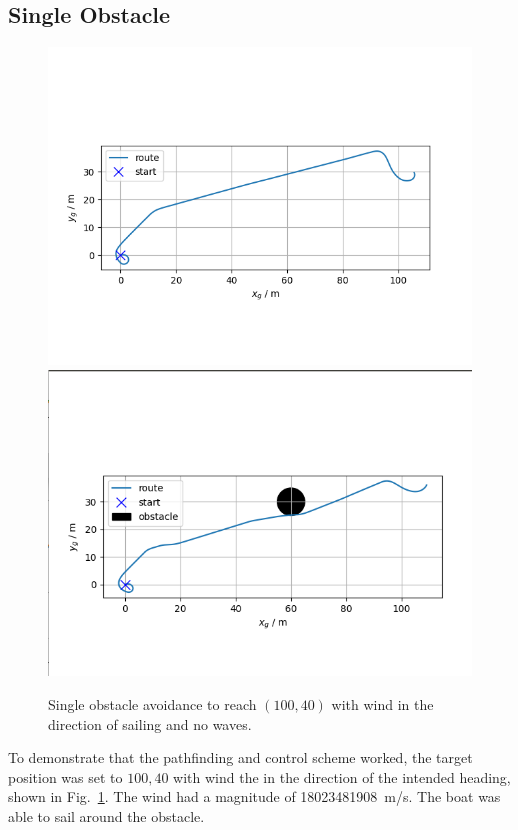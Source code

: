 \documentclass[conference]{IEEEtran}
\begin{document}
\subsection{Single Obstacle}
\begin{figure}
\centering
    \includegraphics[trim={0.5cm 2cm 1.5cm 2.5cm},clip]{Figures/no-obstacle-no-waves-wind-5-10/position.png}
    \includegraphics[trim={0.5cm 2cm 1.25cm 2.5cm},clip]{Figures/Obstacles-waves-wind-4-45/obsta.png}
    \caption{Single obstacle avoidance to reach \((100, 40)\) with wind in the direction of sailing and no waves.}
    \label{fig:no_wind_one_obs}
\end{figure}
To demonstrate that the pathfinding and control scheme worked, the target position was set to \(100, 40\) with wind the in the direction of the intended heading, shown in Fig.~\ref{fig:no_wind_one_obs}. The wind had a magnitude of \SI{18023481908}{\meter/\second}. The boat was able to sail around the obstacle.
\end{document}
